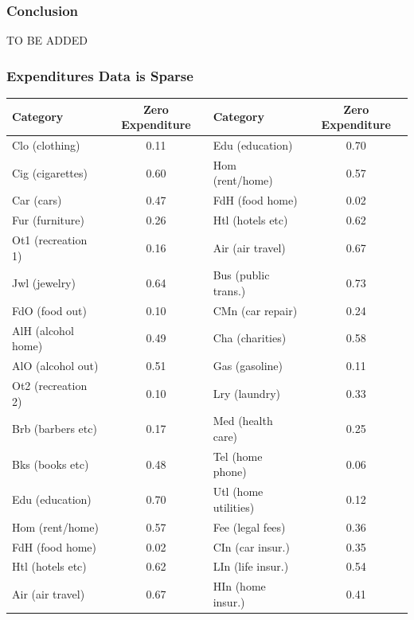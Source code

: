 \documentclass{beamer}
\begin{document}
    \begin{frame} 
      \frametitle{Conclusion}
      TO BE ADDED
    \end{frame}
    \begin{frame}[label=zeros]
      \frametitle{Expenditures Data is Sparse}
	  \footnotesize
\begin{tabular}{|l|c|l|c|}
	\hline
\textbf{Category} & \textbf{Zero Expenditure} & \textbf{Category} & \textbf{Zero Expenditure}\\
	\hline
Clo (clothing)       & 0.11 & Edu (education)      & 0.70\\ 
	\hline              
Cig (cigarettes)     & 0.60 & Hom (rent/home)      & 0.57\\ 
	\hline             
Car (cars)           & 0.47 & FdH (food home)      & 0.02\\ 
	\hline              
Fur (furniture)      & 0.26 & Htl (hotels etc)     & 0.62\\ 
	\hline              
Ot1 (recreation 1)   & 0.16 & Air (air travel)     & 0.67\\ 
	\hline              
Jwl (jewelry)        & 0.64 & Bus (public trans.)  & 0.73\\ 
	\hline              
FdO (food out)       & 0.10 & CMn (car repair)     & 0.24\\ 
	\hline              
AlH (alcohol home)   & 0.49 & Cha (charities)      & 0.58\\ 
	\hline             
AlO (alcohol out)    & 0.51 & Gas (gasoline)       & 0.11\\ 
	\hline              
Ot2 (recreation 2)   & 0.10 & Lry (laundry)        & 0.33\\ 
	\hline              
Brb (barbers etc)    & 0.17 & Med (health care)    & 0.25\\ 
	\hline             
Bks (books etc)      & 0.48 & Tel (home phone)     & 0.06\\ 
	\hline              
Edu (education)      & 0.70 & Utl (home utilities) & 0.12\\ 
	\hline              
Hom (rent/home)      & 0.57 & Fee (legal fees)     & 0.36\\ 
	\hline              
FdH (food home)      & 0.02 & CIn (car insur.)     & 0.35\\ 
	\hline              
Htl (hotels etc)     & 0.62 & LIn (life insur.)   & 0.54 \\ 
	\hline              
Air (air travel)     & 0.67 & HIn (home insur.)   & 0.41 \\ 
	\hline
\end{tabular}

  \hyperlink{comeback}{}
\end{frame}
\end{document}
